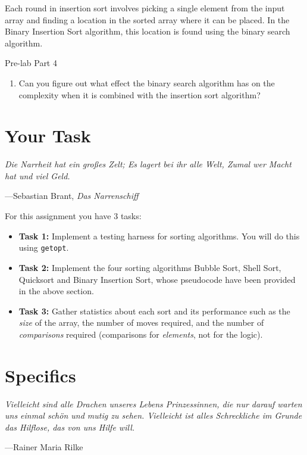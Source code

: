 \documentclass[11pt]{article}
\begin{document}
Each round in insertion sort involves picking a single element from the input
array and finding a location in the sorted array where it can be placed. In the
Binary Insertion Sort algorithm, this location is found using the binary search
algorithm.

\medskip
\begin{prelab}{Pre-lab Part 4}
    \begin{enumerate}
  \item Can you figure out what effect the binary search algorithm has on the
      complexity when it is combined with the insertion sort algorithm?
    \end{enumerate}
\end{prelab}

\section{Your Task}
\epigraph{\emph{Die Narrheit hat ein gro\ss{}es Zelt;
Es lagert bei ihr alle Welt,
Zumal wer Macht hat und viel Geld.}}{---Sebastian Brant, \emph{Das Narrenschiff}}

For this assignment you have 3 tasks:
\begin{itemize}
\item \textbf{Task 1:} Implement a testing harness for sorting algorithms. You will do this using \texttt{getopt}.
\item \textbf{Task 2:} Implement the four sorting algorithms Bubble Sort, Shell Sort, Quicksort and Binary Insertion Sort, whose pseudocode have been provided in the above section.
\item \textbf{Task 3:} Gather statistics about each sort and its performance such as the \emph{size} of the array, the number of moves required, and the number of \emph{comparisons} required (comparisons for \emph{elements}, not for the logic).
\end{itemize}


\section{Specifics}
\epigraph{\emph{Vielleicht sind alle Drachen unseres Lebens Prinzessinnen, die
nur darauf warten uns einmal sch\"on und mutig zu sehen. Vielleicht ist alles
Schreckliche im Grunde das Hilflose, das von uns Hilfe will.}}{---Rainer Maria
Rilke}
\end{document}
